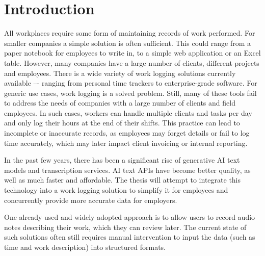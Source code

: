 \documentclass[
  digital,     %
  oneside,     %
  nosansbold,  %
  nocolorbold, %
  lof,         %
  lot,         %
]{fithesis4}
\begin{document}
\printnoidxglossary[type=\acronymtype, title=List of Abbreviations]
\chapter*{Introduction}
All workplaces require some form of maintaining records of work performed. For smaller companies a simple solution is often sufficient. This could range from a paper notebook for employees to write in, to a simple web application or an Excel table. However, many companies have a large number of clients, different projects and employees. There is a wide variety of work logging solutions currently available –- ranging from personal time trackers to enterprise-grade software. For generic use cases, work logging is a solved problem. Still, many of these tools fail to address the needs of companies with a large number of clients and field employees. In such cases, workers can handle multiple clients and tasks per day and only log their hours at the end of their shifts. This practice can lead to incomplete or inaccurate records, as employees may forget details or fail to log time accurately, which may later impact client invoicing or internal reporting.

In the past few years, there has been a significant rise of generative \gls{AI} text models and transcription services. \gls{AI} text \acrshort{API}s have become better quality, as well as  much faster and affordable. The thesis will attempt to integrate this technology into a work logging solution to simplify it for employees and concurrently provide more accurate data for employers.

One already used and widely adopted approach is to allow users to record audio notes describing their work, which they can review later. The current state of such solutions often still requires manual intervention to input the data (such as time and work description) into structured formats.
\end{document}
